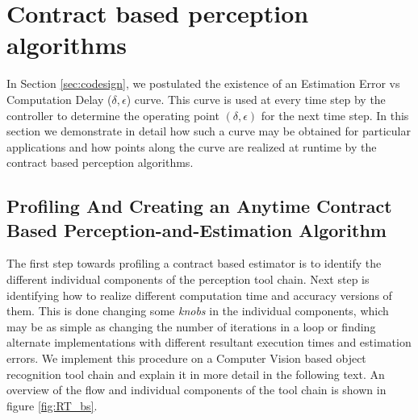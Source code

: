 \section{Contract based perception algorithms}
\label{delayErrorCurve}

In Section \ref{sec:codesign}, we postulated the existence of an Estimation Error vs Computation Delay ($\delta,\epsilon$) curve. %
This curve is used at every time step by the controller to determine the operating point $(\delta,\epsilon)$ for the next time step.
In this section we demonstrate in detail how such a curve may be obtained for particular applications and how points along the curve are realized at runtime by the contract based perception algorithms.

\subsection{Profiling And Creating an Anytime Contract Based Perception-and-Estimation Algorithm}


The first step towards profiling a contract based estimator is to identify the different individual components of the perception tool chain. Next step is identifying how to realize different computation time and accuracy versions of them. This is done changing some \textit{knobs} in the individual components, which may be as simple as changing the number of iterations in a loop \cite{loop-perf} or finding alternate implementations with different resultant execution times and estimation errors. We implement this procedure on a Computer Vision based object recognition tool chain and explain it in more detail in the following text. An overview of the flow and individual components of the tool chain is shown in figure \ref{fig:RT_bs}.

